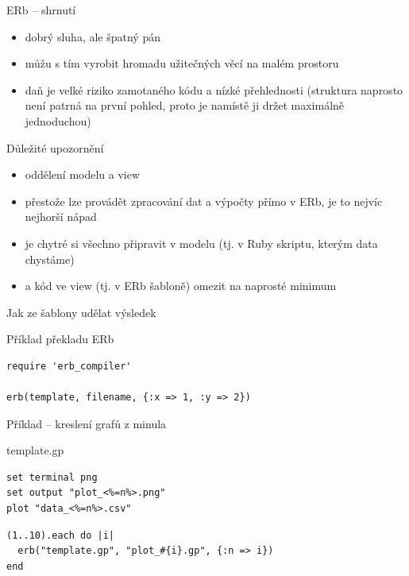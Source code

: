\documentclass{beamer}
\begin{document}
\begin{frame}{ERb -- shrnutí}
  \begin{itemize}
    \item dobrý sluha, ale špatný pán
    \item můžu s tím vyrobit hromadu užitečných věcí na malém prostoru
    \item daň je velké riziko zamotaného kódu a nízké přehlednosti (struktura naprosto není patrná na první pohled, proto je namístě ji držet maximálně jednoduchou)
  \end{itemize}
\end{frame}

\begin{frame}{Důležité upozornění}
  \begin{itemize}
    \item oddělení modelu a view
    \item přestože lze provádět zpracování dat a výpočty přímo v ERb, je to nejvíc nejhorší nápad
    \item je chytré si všechno připravit v modelu (tj. v Ruby skriptu, kterým data chystáme)
    \item a kód ve view (tj. v ERb šabloně) omezit na naprosté minimum
  \end{itemize}
\end{frame}

\begin{frame}[fragile]{Jak ze šablony udělat výsledek}
  \scriptsize
  \begin{block}{Příklad překladu ERb}
    \scriptsize
    \begin{verbatim}
require 'erb_compiler'

erb(template, filename, {:x => 1, :y => 2})
    \end{verbatim}
  \end{block}
\end{frame}

\begin{frame}[fragile]{Příklad -- kreslení grafů z minula}
  \begin{block}{template.gp}
    \scriptsize
    \begin{verbatim}
set terminal png
set output "plot_<%=n%>.png"
plot "data_<%=n%>.csv"
    \end{verbatim}
  \end{block}
  \begin{block}{}
    \scriptsize
    \begin{verbatim}
(1..10).each do |i|
  erb("template.gp", "plot_#{i}.gp", {:n => i})
end
    \end{verbatim}
  \end{block}
\end{frame}
\end{document}
